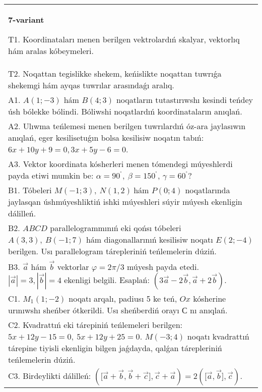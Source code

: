 \documentclass{article}
\begin{document}
\begin{tabular}{m{17cm}}
\textbf{7-variant}
\newline

T1. 
Koordinataları menen berilgen vektrolardıń skalyar, vektorlıq hám aralas kóbeymeleri. \\
T2. 
Noqattan tegislikke shekem, keńislikte noqattan tuwrıǵa shekemgi hám ayqas tuwrılar arasındaǵı aralıq. \\
A1. 
$A(1;-3)$ hám $B(4;3)$ noqatların tutastırıwshı
kesindi teńdey úsh bólekke bólindi. Bóliwshi noqatlardıń koordinataların
anıqlań.
 \\
A2. 
Ulıwma teńlemesi menen berilgen tuwrılardıń      
óz-ara jaylasıwın anıqlań, eger kesilisetuǵın bolsa kesilisiw noqatın 
tabıń: $6x+10y+9=0, 3x+5y-6=0$.
 \\
A3. 
Vektor koordinata kósherleri menen tómendegi múyeshlerdi payda etiwi
mumkin be: $\alpha = 90^{{^\circ}},\ \beta = 150^{{^\circ}}$,
$\gamma = 60^{{^\circ}}?$ 
 \\
B1. 
Tóbeleri \(M(-1;3),\ N(1,2)\ \)hám \(P(0;4)\)
noqatlarında jaylasqan úshmúyeshliktiń ishki múyeshleri súyir múyesh
ekenligin dálilleń.
 \\
B2. 
$ABCD$ parallelogrammınıń eki qońsı tóbeleri
\(A(3,3),\ B(-1;7)\) hám diagonallarınıń kesilisiw noqatı
\(E(2;-4)\) berilgen. Usı parallelogram tárepleriniń teńlemelerin
dúziń.
 \\
B3. 
$\vec{a}$ hám $\vec{b}$ vektorlar $\varphi = 2\pi/3$ múyesh payda etedi. $|\vec{a}| = 3,|\vec{b}| = 4$ ekenligi belgili. Esaplań: 
$\left(3\vec{a} - 2\vec{b},\vec{a} + 2\vec{b} \right)$.
 \\
C1. 
\(M_{1}(1; - 2)\) noqatı arqalı, padiusı 5 ke teń,
$Ox$ kósherine urınıwshı sheńber ótkerildi. Usı sheńberdiń orayı
$С$ nı anıqlań.
 \\
C2. 
Kvadrattıń eki tárepiniń teńlemeleri berilgen:
\(5x + 12y - 15 = 0,\ 5x + 12y + 25 = 0.\) \(M( - 3;4)\) noqatı
kvadrattıń tárepine tiyisli ekenligin bilgen jaǵdayda, qalǵan
tárepleriniń teńlemelerin dúziń.
 \\
C3. 
Birdeylikti dálilleń: \((\lbrack\vec{a} + \vec{b},\vec{b} + \vec{c}\rbrack,\vec{c} + \vec{a}) = 2 (\lbrack\vec{a},\vec{b}\rbrack,\vec{c}) \).
 \\

\end{tabular}
\vspace{1cm}
\end{document}

